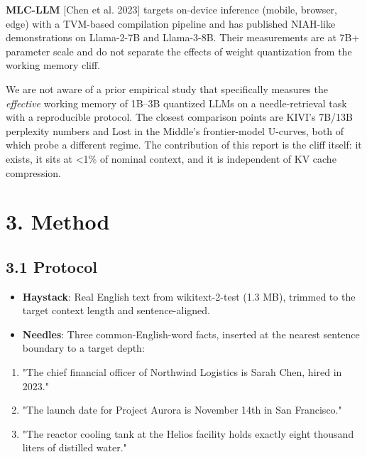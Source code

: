 \documentclass[11pt]{article}
\begin{document}
\textbf{MLC-LLM} [Chen et al. 2023] targets on-device inference (mobile, browser, edge) with a TVM-based compilation pipeline and has published NIAH-like demonstrations on Llama-2-7B and Llama-3-8B. Their measurements are at 7B+ parameter scale and do not separate the effects of weight quantization from the working memory cliff.


We are not aware of a prior empirical study that specifically measures the \textit{effective} working memory of 1B–3B quantized LLMs on a needle-retrieval task with a reproducible protocol. The closest comparison points are KIVI's 7B/13B perplexity numbers and Lost in the Middle's frontier-model U-curves, both of which probe a different regime. The contribution of this report is the cliff itself: it exists, it sits at <1\% of nominal context, and it is independent of KV cache compression.


\section*{3. Method}


\subsection*{3.1 Protocol}


\begin{itemize}
\item \textbf{Haystack}: Real English text from wikitext-2-test (1.3 MB), trimmed to the target context length and sentence-aligned.
\item \textbf{Needles}: Three common-English-word facts, inserted at the nearest sentence boundary to a target depth:
\end{itemize}

\begin{enumerate}
\item "The chief financial officer of Northwind Logistics is Sarah Chen, hired in 2023."
\item "The launch date for Project Aurora is November 14th in San Francisco."
\item "The reactor cooling tank at the Helios facility holds exactly eight thousand liters of distilled water."
\end{enumerate}
\end{document}
